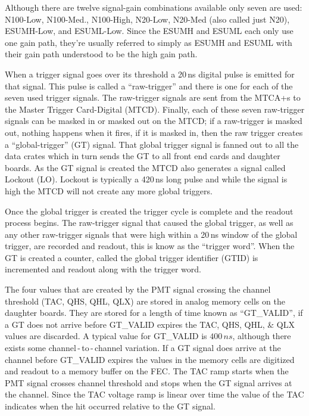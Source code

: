 Although there are twelve signal-gain combinations available only seven are
used: N100-Low, N100-Med., N100-High, N20-Low, N20-Med (also called just N20), ESUMH-Low, and ESUML-Low.
Since the ESUMH and ESUML each only use one gain path, they're usually
referred to simply as ESUMH and ESUML with their gain path understood to be
the high gain path.

When a trigger signal goes over its threshold a 20\,ns digital pulse is
emitted for that signal. This pulse is called a ``raw-trigger'' and there is
one for each of the seven used trigger signals.
The raw-trigger signals are sent from the MTCA+s to the Master Trigger
Card-Digital (MTCD).
Finally, each of these seven raw-trigger signals can be masked in or masked out on
the MTCD\@;
if a raw-trigger is masked out, nothing happens when it fires,
if it is masked in, then the raw trigger creates a ``global-trigger'' (GT) signal.
That global trigger signal is fanned out to all the data crates which
in turn sends the GT to all front end cards and daughter boards.
As the GT signal is created the MTCD also generates a signal
called Lockout (LO). Lockout is typically a 420\,ns long pulse and while
the signal is high the MTCD will not create any more global triggers.

Once the global trigger is created the trigger cycle is complete and
the readout process begins.
The raw-trigger signal that caused the global trigger, as well as any other
raw-trigger signals that were high within a 20\,ns window of the global trigger,
are recorded and readout, this is know as the ``trigger word''.
When the GT is created a counter, called the global trigger identifier (GTID) is incremented
and readout along with the trigger word.

The four values that are created by the PMT signal crossing
the channel threshold (TAC, QHS, QHL, QLX) are stored in analog memory
cells on the daughter boards.
They are stored for a length of time known as ``GT\_VALID'', if
a GT does not arrive before GT\_VALID expires the TAC, QHS, QHL, \& QLX values
are discarded. A typical value for GT\_VALID is $400\,ns$, although
there exists some channel\,-\,to\,-\,channel variation.
If a GT signal does arrive at the channel before GT\_VALID expires the
values in the memory cells are digitized and readout to a memory buffer
on the FEC\@.
The TAC ramp starts when the PMT signal crosses channel threshold
and stops when the GT signal arrives at the channel.
Since the TAC voltage ramp is linear over time the value of the TAC
indicates when the hit occurred relative to the GT signal.

